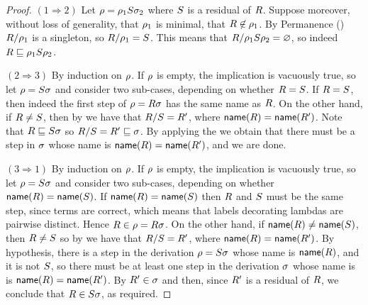 \begin{proof}
$(1 \Rightarrow 2)$
  Let $\rho = \rho_1S\sigma_2$ where $S$ is a residual of $R$.
  Suppose moreover, without loss of generality,
  that $\rho_1$ is minimal, \ie that $R \not\in \rho_1$.
  By Permanence () $R/\rho_1$ is a singleton,
  so $R/\rho_1 = S$.
  This means that $R/\rho_1S\rho_2 = \varnothing$,
  so indeed $R \sqsubseteq \rho_1S\rho_2$.

$(2 \Rightarrow 3)$
  By induction on $\rho$.
  If $\rho$ is empty, the implication is vacuously true,
  so let $\rho = S\sigma$
  and consider two sub-cases, depending on whether $R = S$.
  If $R = S$, then indeed the first step of $\rho = R\sigma$
  has the same name as $R$.
  On the other hand, if $R \neq S$, 
  then by 
  we have that $R/S = R'$,
  where $\mathsf{name}(R) = \mathsf{name}(R')$.
  Note that $R \sqsubseteq S\sigma$ 
  so $R/S = R' \sqsubseteq \sigma$.
  By applying the \ih we obtain that there must be a step in $\sigma$
  whose name is $\mathsf{name}(R) = \mathsf{name}(R')$, and we are done.

$(3 \Rightarrow 1)$
  By induction on $\rho$.
  If $\rho$ is empty, the implication is vacuously true,
  so let $\rho = S\sigma$
  and consider two sub-cases, depending on whether $\mathsf{name}(R) = \mathsf{name}(S)$.
  If $\mathsf{name}(R) = \mathsf{name}(S)$ then $R$ and $S$ must be the same step,
  since terms are correct, which means that labels decorating lambdas are pairwise distinct.
  Hence $R \in \rho = R\sigma$.
  On the other hand, if $\mathsf{name}(R) \neq \mathsf{name}(S)$, then
  $R \neq S$ so by 
  we have that $R/S = R'$,
  where $\mathsf{name}(R) = \mathsf{name}(R')$.
  By hypothesis, there is a step in the derivation $\rho = S\sigma$ whose name
  is $\mathsf{name}(R)$, and it is not $S$, so there must be at least one step in the
  derivation $\sigma$ whose name is is $\mathsf{name}(R) = \mathsf{name}(R')$.
  By \ih $R' \in \sigma$
  and then, since $R'$ is a residual of $R$,
  we conclude that $R \in S\sigma$,
  as required.
\end{proof}

\bigskip

